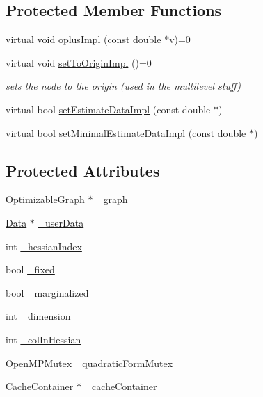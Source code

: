 \subsection*{Protected Member Functions}
\begin{DoxyCompactItemize}
\item 
virtual void \hyperlink{classg2o_1_1OptimizableGraph_1_1Vertex_a4537a46afb8d12c3f18c88ba9601c625}{oplus\+Impl} (const double $\ast$v)=0
\item 
virtual void \hyperlink{classg2o_1_1OptimizableGraph_1_1Vertex_abd5fe36815f27a9c174ad41c2070c247}{set\+To\+Origin\+Impl} ()=0
\begin{DoxyCompactList}\small\item\em sets the node to the origin (used in the multilevel stuff) \end{DoxyCompactList}\item 
virtual bool \hyperlink{classg2o_1_1OptimizableGraph_1_1Vertex_a35ab439967fd3a3d3e5608e3883d8487}{set\+Estimate\+Data\+Impl} (const double $\ast$)
\item 
virtual bool \hyperlink{classg2o_1_1OptimizableGraph_1_1Vertex_a088ecbdde86968f3896b2320f80ee396}{set\+Minimal\+Estimate\+Data\+Impl} (const double $\ast$)
\end{DoxyCompactItemize}
\subsection*{Protected Attributes}
\begin{DoxyCompactItemize}
\item 
\hyperlink{structg2o_1_1OptimizableGraph}{Optimizable\+Graph} $\ast$ \hyperlink{classg2o_1_1OptimizableGraph_1_1Vertex_a6e14fd3ad8e531ead03b4d83cc7362ad}{\+\_\+graph}
\item 
\hyperlink{classg2o_1_1OptimizableGraph_1_1Data}{Data} $\ast$ \hyperlink{classg2o_1_1OptimizableGraph_1_1Vertex_a71eb5fdfaf5c9a442135502e23504500}{\+\_\+user\+Data}
\item 
int \hyperlink{classg2o_1_1OptimizableGraph_1_1Vertex_aebf035f2c8177b5dac1bc650e0f0cf62}{\+\_\+hessian\+Index}
\item 
bool \hyperlink{classg2o_1_1OptimizableGraph_1_1Vertex_af98461471e6b58664a9fc4bba9340501}{\+\_\+fixed}
\item 
bool \hyperlink{classg2o_1_1OptimizableGraph_1_1Vertex_a5e9b3906c8ff800b9a0b16b10ed9fff0}{\+\_\+marginalized}
\item 
int \hyperlink{classg2o_1_1OptimizableGraph_1_1Vertex_ab053ffd8851cd3b0f61576ffd349d68e}{\+\_\+dimension}
\item 
int \hyperlink{classg2o_1_1OptimizableGraph_1_1Vertex_add1f5a0236a175784a824524244f7085}{\+\_\+col\+In\+Hessian}
\item 
\hyperlink{classg2o_1_1OpenMPMutex}{Open\+M\+P\+Mutex} \hyperlink{classg2o_1_1OptimizableGraph_1_1Vertex_ab9b85ddb487ad4818bc53e0c00ff7bcc}{\+\_\+quadratic\+Form\+Mutex}
\item 
\hyperlink{classg2o_1_1CacheContainer}{Cache\+Container} $\ast$ \hyperlink{classg2o_1_1OptimizableGraph_1_1Vertex_a6eed5b850221cd76f0af46b97860f2e8}{\+\_\+cache\+Container}
\end{DoxyCompactItemize}
